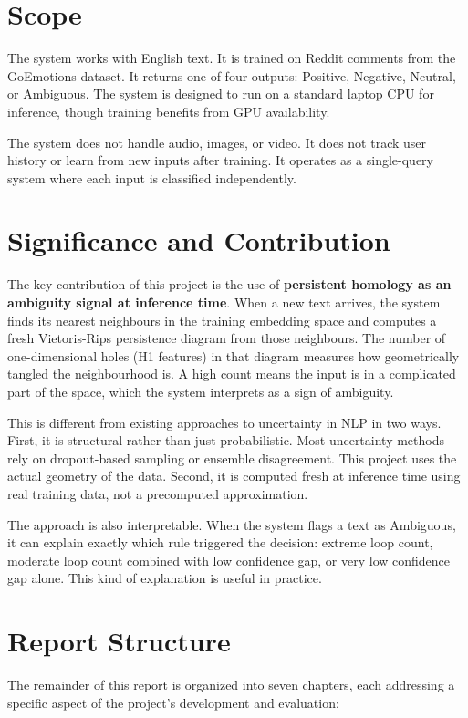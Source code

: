 \section{Scope}

The system works with English text. It is trained on Reddit comments from the GoEmotions
dataset. It returns one of four outputs: Positive, Negative, Neutral, or Ambiguous. The system
is designed to run on a standard laptop CPU for inference, though training benefits from GPU
availability.

The system does not handle audio, images, or video. It does not track user history or learn from
new inputs after training. It operates as a single-query system where each input is classified
independently.

\section{Significance and Contribution}

The key contribution of this project is the use of \textbf{persistent homology as an ambiguity
signal at inference time}. When a new text arrives, the system finds its nearest neighbours in
the training embedding space and computes a fresh Vietoris-Rips persistence diagram from
those neighbours. The number of one-dimensional holes (H1 features) in that diagram measures
how geometrically tangled the neighbourhood is. A high count means the input is in a
complicated part of the space, which the system interprets as a sign of ambiguity.

This is different from existing approaches to uncertainty in NLP in two ways. First, it is
structural rather than just probabilistic. Most uncertainty methods rely on dropout-based
sampling or ensemble disagreement. This project uses the actual geometry of the data. Second,
it is computed fresh at inference time using real training data, not a precomputed approximation.

The approach is also interpretable. When the system flags a text as Ambiguous, it can explain
exactly which rule triggered the decision: extreme loop count, moderate loop count combined
with low confidence gap, or very low confidence gap alone. This kind of explanation is useful in
practice.

\section{Report Structure}

The remainder of this report is organized into seven chapters, each addressing a specific aspect of the project's development and evaluation:

